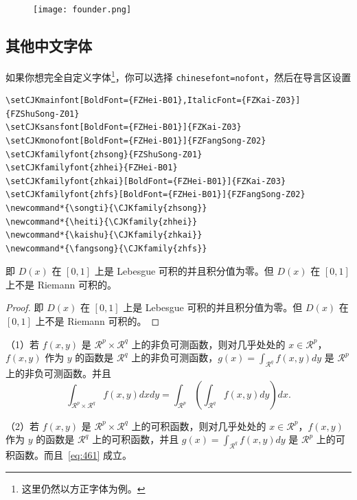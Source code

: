 \documentclass[lang=cn,newtx,10pt,scheme=chinese,pad,twocol]{zznote}
\begin{document}
\begin{figure}[!htb]
	\centering
	\texttt{[image: founder.png]}
\end{figure}
\subsection{其他中文字体}
如果你想完全自定义字体\footnote{这里仍然以方正字体为例。}，你可以选择 \lstinline{chinesefont=nofont}，然后在导言区设置
\begin{lstlisting}
\setCJKmainfont[BoldFont={FZHei-B01},ItalicFont={FZKai-Z03}]{FZShuSong-Z01}
\setCJKsansfont[BoldFont={FZHei-B01}]{FZKai-Z03}
\setCJKmonofont[BoldFont={FZHei-B01}]{FZFangSong-Z02}
\setCJKfamilyfont{zhsong}{FZShuSong-Z01}
\setCJKfamilyfont{zhhei}{FZHei-B01}
\setCJKfamilyfont{zhkai}[BoldFont={FZHei-B01}]{FZKai-Z03}
\setCJKfamilyfont{zhfs}[BoldFont={FZHei-B01}]{FZFangSong-Z02}
\newcommand*{\songti}{\CJKfamily{zhsong}}
\newcommand*{\heiti}{\CJKfamily{zhhei}}
\newcommand*{\kaishu}{\CJKfamily{zhkai}}
\newcommand*{\fangsong}{\CJKfamily{zhfs}}
\end{lstlisting}



\begin{solution}
	即 $D(x)$ 在 $[0,1]$ 上是 Lebesgue 可积的并且积分值为零。但 $D(x)$ 在 $[0,1]$ 上不是 Riemann 可积的。
\end{solution}

\begin{proof}
	即 $D(x)$ 在 $[0,1]$ 上是 Lebesgue 可积的并且积分值为零。但 $D(x)$ 在 $[0,1]$ 上不是 Riemann 可积的。
\end{proof}

\begin{theorem}[Fubini 定理] \label{thm:fubi}
	（1）若 $f(x,y)$ 是 $\mathcal{R}^p\times\mathcal{R}^q$ 上的非负可测函数，则对几乎处处的 $x\in \mathcal{R}^p$，$f(x,y)$ 作为 $y$ 的函数是 $\mathcal{R}^q$ 上的非负可测函数，$g(x)=\int_{\mathcal{R}^q}f(x,y) dy$ 是 $\mathcal{R}^p$ 上的非负可测函数。并且
	\begin{equation}
		\label{eq:461}
		\int_{\mathcal{R}^p\times\mathcal{R}^q} f(x,y) dxdy=\int_{\mathcal{R}^p}\left(\int_{\mathcal{R}^q}f(x,y)dy\right)dx.
	\end{equation}

	（2）若 $f(x,y)$ 是 $\mathcal{R}^p\times\mathcal{R}^q$ 上的可积函数，则对几乎处处的 $x\in\mathcal{R}^p$，$f(x,y)$ 作为 $y$ 的函数是 $\mathcal{R}^q$ 上的可积函数，并且 $g(x)=\int_{\mathcal{R}^q}f(x,y) dy$ 是 $\mathcal{R}^p$ 上的可积函数。而且~\eqref{eq:461} 成立。
\end{theorem}
\end{document}
